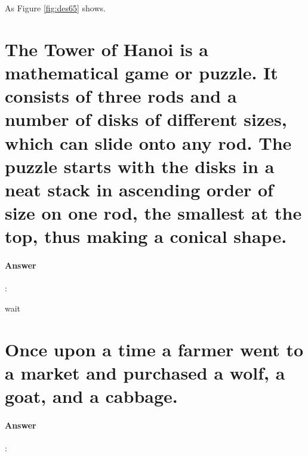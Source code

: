 \documentclass{article}
\begin{document}
As Figure \ref{fig:des65} shows.

\section{The Tower of Hanoi is a mathematical game or puzzle. It consists of three rods and a number of disks of different sizes, which can slide onto any rod. The puzzle starts with the disks in a neat stack in ascending order of size on one rod, the smallest at the top, thus making a conical shape.}

\paragraph{Answer}:

wait


\section{Once upon a time a farmer went to a market and purchased a wolf, a goat, and a cabbage.}

\paragraph{Answer}:
\end{document}
